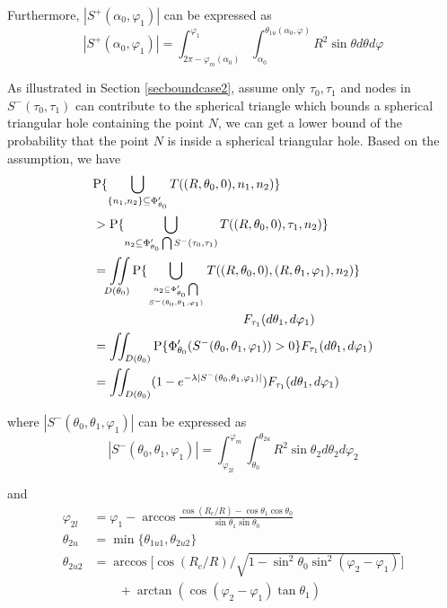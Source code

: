 \documentclass[journal, twoside]{IEEEtran}
\begin{document}
\begin{IEEEproof}
Furthermore, $|S^+(\alpha_0, \varphi_1)|$ can be expressed as 
\begin{displaymath}
  |S^+(\alpha_0, \varphi_1)| = \int_{2\pi - \varphi_m(\alpha_0)}^{\varphi_1} \int_{\alpha_0}^{\theta_{1u}(\alpha_0, \varphi)} R^2 \sin \theta d\theta d\varphi
\end{displaymath}

As illustrated in Section \ref{secboundcase2}, assume only $\tau_0, \tau_1$ 
and nodes in $S^-(\tau_0, \tau_1)$ can
contribute to the spherical triangle which bounds a spherical triangular hole containing the
point $N$, we can get a lower bound of the probability that the
point $N$ is inside a spherical triangular hole. Based on the assumption,
we have
\begin{equation} \label{eqplower2}
  \begin{split}
    &\mathrm{P}\{\bigcup_{\{n_1, n_2\} \subseteq \Phi_{\theta_0}^\prime} T((R, \theta_0, 0), n_1, n_2)\}  \\
    & > \mathrm{P}\{\bigcup_{n_2 \subseteq \Phi_{\theta_0}^\prime \bigcap S^-(\tau_0, \tau_1) } T((R, \theta_0, 0), \tau_1, n_2)\}\\
    & = \iint\limits_{D(\theta_0)} \mathrm{P} \{ \bigcup_{n_2 \subseteq \Phi_{\theta_0}^\prime \bigcap \atop S^-(\theta_0, \theta_1, \varphi_1)} T((R, \theta_0, 0), (R, \theta_1, \varphi_1), n_2) \} \\
    & \qquad \qquad \qquad \qquad \qquad\qquad  F_{\tau_1} (d\theta_1, d\varphi_1) \\
    & = \iint_{D(\theta_0)} \mathrm{P} \{\Phi_{\theta_0}^\prime (S^-(\theta_0, \theta_1, \varphi_1)) > 0 \} F_{\tau_1} (d\theta_1, d\varphi_1)\\
    & = \iint_{D(\theta_0)} (1- e^{-\lambda |S^-(\theta_0, \theta_1, \varphi_1)|}) F_{\tau_1} (d\theta_1, d\varphi_1)
  \end{split}
\end{equation}

\noindent where $|S^-(\theta_0, \theta_1, \varphi_1)|$ can be expressed as
\begin{equation*} \label{eqareasminus}
 |S^-(\theta_0, \theta_1, \varphi_1)| = \int_{\varphi_{2l}}^{\varphi_m} \int_{\theta_0}^{\theta_{2u}} R^2 \sin \theta_2 d\theta_2 d\varphi_2
\end{equation*}

\noindent and
\begin{displaymath}
 \begin{split} 
   \varphi_{2l} &= \varphi_1 - \arccos \frac{\cos (R_c/R) - \cos \theta_1 \cos \theta_0}{\sin \theta_1 \sin \theta_0} \\
   \theta_{2u} &= \min \{\theta_{1u1}, \theta_{2u2} \} \\
   \theta_{2u2} &= \arccos \Big [\cos(R_c/R)/\sqrt{1-\sin^2\theta_0 \sin^2 (\varphi_2 - \varphi_1)} \Big] \\
   & \qquad + \arctan(\cos (\varphi_2 - \varphi_1) \tan \theta_1)
 \end{split}
\end{displaymath}


\end{IEEEproof}
\end{document}
